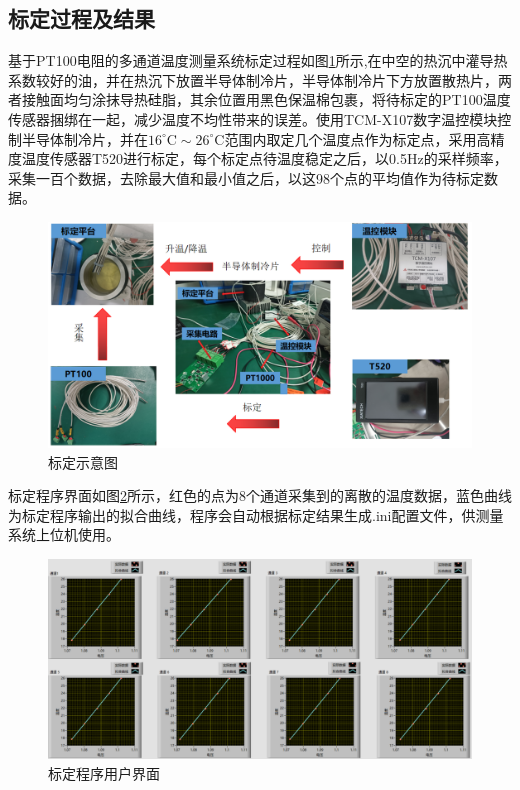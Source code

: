 \subsection{标定过程及结果}
基于PT100电阻的多通道温度测量系统标定过程如图\ref{fig:标定示意图}所示,在中空的热沉中灌导热系数较好的油，并在热沉下放置半导体制冷片，半导体制冷片下方放置散热片，两者接触面均匀涂抹导热硅脂，其余位置用黑色保温棉包裹，将待标定的PT100温度传感器捆绑在一起，减少温度不均性带来的误差。使用TCM-X107数字温控模块控制半导体制冷片，并在\(16^{\circ} \mathrm{C} \sim 26^{\circ} \mathrm{C}\)范围内取定几个温度点作为标定点，采用高精度温度传感器T520进行标定，每个标定点待温度稳定之后，以0.5Hz的采样频率，采集一百个数据，去除最大值和最小值之后，以这98个点的平均值作为待标定数据。
  \begin{figure}[htb]
    \centering
    \includegraphics[width=12cm]{fig/3-fig/温度测量系统标定示意图.jpg}
    \caption{标定示意图}
    \label{fig:标定示意图}
\end{figure}

标定程序界面如图\ref{fig:标定程序用户界面}所示，红色的点为8个通道采集到的离散的温度数据，蓝色曲线为标定程序输出的拟合曲线，程序会自动根据标定结果生成.ini配置文件，供测量系统上位机使用。
\begin{figure}[htb]
    \centering
    \includegraphics[width=13cm]{fig/3-fig/标定程序前面板.jpg}
    \caption{标定程序用户界面}
    \label{fig:标定程序用户界面}
\end{figure}

